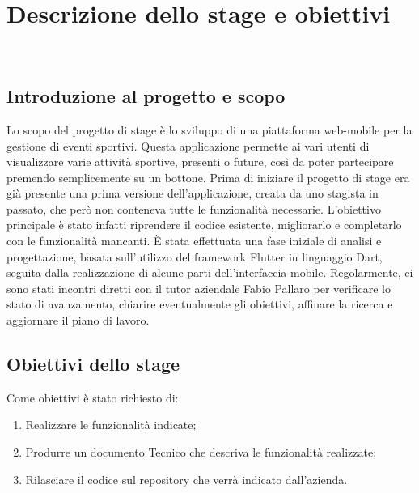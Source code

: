 
\chapter{Descrizione dello stage e obiettivi}
\label{cap:Descrizione dello stage e obiettivi}

\\

\section{Introduzione al progetto e scopo}
Lo scopo del progetto di stage è lo sviluppo di una piattaforma web-mobile per la gestione di eventi sportivi. Questa applicazione permette ai vari utenti di visualizzare varie attività sportive, presenti o future, così da poter partecipare premendo semplicemente su un bottone. Prima di iniziare il progetto di stage era già presente una prima versione dell'applicazione, creata da uno stagista in passato, che però non conteneva tutte le funzionalità necessarie. L'obiettivo principale è stato infatti riprendere il codice esistente, migliorarlo e completarlo con le funzionalità mancanti. È stata effettuata una fase iniziale di analisi e progettazione, basata sull’utilizzo del framework Flutter in linguaggio Dart, seguita dalla realizzazione di alcune parti dell’interfaccia mobile.
Regolarmente, ci sono stati incontri diretti con il tutor aziendale Fabio Pallaro per verificare lo stato di avanzamento, chiarire eventualmente gli obiettivi, affinare la ricerca e aggiornare il piano di lavoro.

\section{Obiettivi dello stage}
Come obiettivi è stato richiesto di:
\begin{enumerate}
	\item Realizzare le funzionalità indicate;
	\item Produrre un documento Tecnico che descriva le funzionalità realizzate;
	\item Rilasciare il codice sul repository che verrà indicato dall’azienda.\\
	
\end{enumerate}
